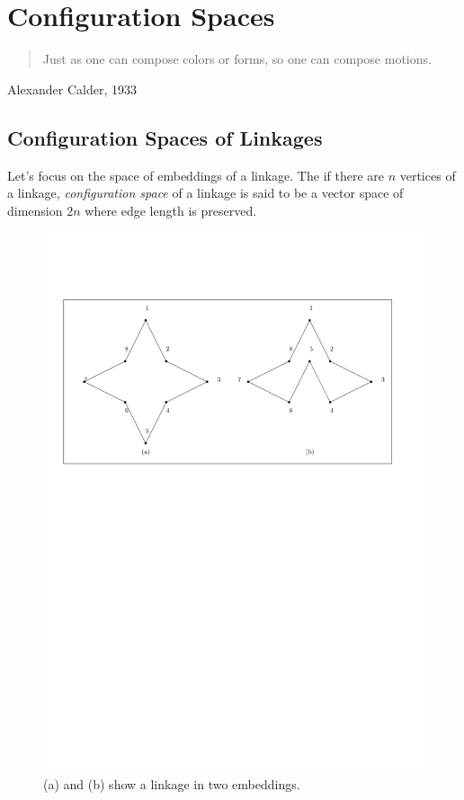 \section{Configuration Spaces}
\begin{quote}
Just as one can compose colors or forms, so one can compose motions.
\end{quote}
{\raggedright{}Alexander Calder, 1933}

\subsection{Configuration Spaces of Linkages}
Let's focus on the space of embeddings of a linkage. The if there are $n$ vertices of a linkage, 
\textit{configuration space} of a linkage is said to be a vector space of dimension $2 n$ 
where edge length is preserved.  
\begin{figure}[!h]
\begin{center}
\includegraphics[scale=.75]{graphics/twoEmbeddingsOfSameLinkage.pdf}
\end{center} 
\caption{(a) and (b) show a linkage in two embeddings.}
\label{fig:configuration-3}
\end{figure}
